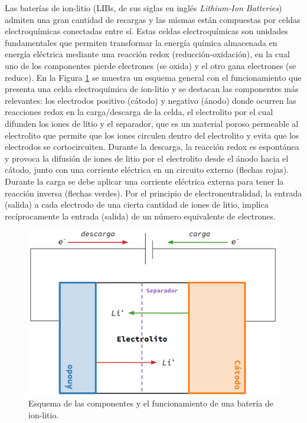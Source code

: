 Las baterías de ion-litio (LIBs, de sus siglas en inglés \textit{Lithium-Ion 
Batteries}) admiten una gran cantidad de recargas y las mismas están compuestas 
por celdas electroquímicas conectadas entre sí. Estas celdas electroquímicas son unidades 
fundamentales que permiten transformar la energía química almacenada en energía
eléctrica mediante una reacción redox (reducción-oxidación), en la cual uno de los 
componentes pierde electrones (se oxida) y el otro gana electrones (se reduce).
En la Figura \ref{fig:esquema-bateria} se muestra un esquema general con el 
funcionamiento que presenta una celda electroquímica de ion-litio y se destacan 
las componentes más relevantes: los electrodos positivo (cátodo) y negativo (ánodo) 
donde ocurren las reacciones redox en la carga/descarga de la celda, el electrolito 
por el cual difunden los iones de litio y el separador, que es un material 
poroso permeable al electrolito que permite que los iones circulen dentro del 
electrolito y evita que los electrodos se cortocircuiten.
Durante la descarga, la reacción redox es espontánea y 
provoca la difusión de iones de litio por el electrolito desde el ánodo hacia el 
cátodo, junto con una corriente eléctrica en un circuito externo (flechas rojas). 
Durante la carga se debe aplicar una corriente eléctrica externa para tener la 
reacción inversa (flechas verdes).
Por el principio de electroneutralidad, la entrada (salida) a cada electrodo de una cierta cantidad de iones de litio, implica recíprocamente la entrada (salida) de un número equivalente de electrones.
\begin{figure}[h!]
    \centering
    \includegraphics[width=.8\textwidth]{Introduccion/baterias/esquema_bateria.png}
    \caption{Esquema de las componentes y el funcionamiento de una batería de 
    ion-litio.}
    \label{fig:esquema-bateria}
\end{figure}

